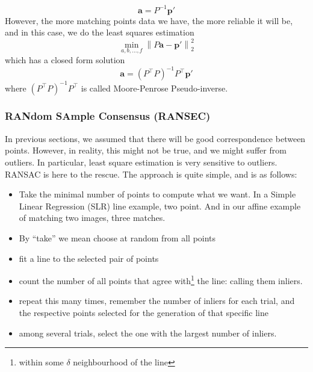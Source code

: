 \documentclass[11pt]{article}
\newcommand{\ba}{\mathbf{a}}
\newcommand{\bp}{\mathbf{p}}
\newcommand{\norm}[1]{\left\lVert#1\right\rVert}
\begin{document}
\begin{equation}
	\ba = P^{-1}\bp'
\end{equation}
However, the more matching points data we have, the more reliable it will be, and in this case, we do the least squares estimation
\begin{equation}
	\underset{a, b, ..., f}{\operatorname{min}} \norm{P\ba - \bp'}_2^2
\end{equation} 
which has a closed form solution
\begin{equation}
	\ba = (P^\top P) ^{-1} P^\top \bp'
\end{equation}
where $(P^\top P) ^{-1} P^\top$ is called Moore-Penrose Pseudo-inverse. 

\subsubsection{RANdom SAmple Consensus (RANSEC)}
In previous sections, we assumed that there will be good correspondence between points. However, in reality, this might not be true, and we might suffer from outliers. In particular, least square estimation is very sensitive to outliers. RANSAC is here to the rescue. The approach is quite simple, and is as follows:
\begin{itemize}
	\item Take the minimal number of points to compute what we want. In a Simple Linear Regression (SLR) line example, two point. And in our affine example of matching two images, three matches. 
	\item By ``take'' we mean choose at random from all points
	\item fit a line to the selected pair of points 
	\item count the number of all points that agree with\footnote{within some $\delta$ neighbourhood of the line} the line: calling them inliers.
	\item repeat this many times, remember the number of inliers for each trial, and the respective points selected for the generation of that specific line
	\item among several trials, select the one with the largest number of inliers. 
\end{itemize}
\end{document}
